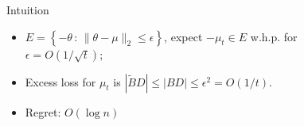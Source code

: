 \documentclass[final]{beamer} %
\newcommand{\set}[2]{\left\{#1 \,:\, #2 \right\}}
\begin{document}
\begin{frame}[c]
\begin{columns}[t,totalwidth=\textwidth]
\begin{column}{.32\textwidth}
\begin{block}{Intuition}
						\begin{itemize}
							\item $E = \set{-\theta}{\|\theta - \mu\|_2 \le \epsilon}$, expect $-\mu_t \in E$ w.h.p. for $\epsilon=O(1/\sqrt{t})$;
							\item Excess loss for $\mu_t$ is $|\tilde{B}D| \le |BD| \le \epsilon^2 = O(1/t)$.
							\item Regret: $O(\log n)$
						\end{itemize}
				\end{block}


	\end{column}
	\begin{column}{0.01\textwidth}
	\end{column}
	
	\begin{column}{.32\textwidth}%


\end{column}
\end{columns}
\end{frame}
\end{document}
